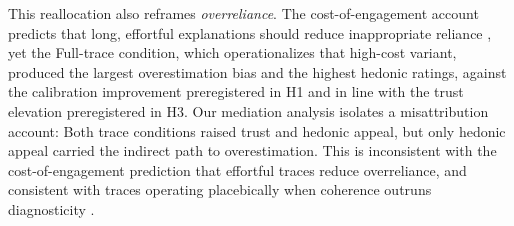 \documentclass[manuscript,review,anonymous]{acmart}
\let\xtodo\todo
\renewcommand{\todo}[1]{\xtodo[inline,color=green!50]{#1}}
\newcommand{\todoshort}[1]{\xtodo[inline,color=cyan!30]{\textbf{SHORTER:} #1}}
\begin{document}
This reallocation also reframes \textit{overreliance}. The cost-of-engagement account predicts that long, effortful explanations should reduce inappropriate reliance \cite{vasconcelos2023explanations}, yet the Full-trace condition, which operationalizes that high-cost variant, produced the largest overestimation bias and the highest hedonic ratings, against the calibration improvement preregistered in H1 and in line with the trust elevation preregistered in H3. Our mediation analysis isolates a misattribution account: Both trace conditions raised trust and hedonic appeal, but only hedonic appeal carried the indirect path to overestimation. This is inconsistent with the cost-of-engagement prediction \cite{vasconcelos2023explanations} that effortful traces reduce overreliance, and consistent with traces operating placebically when coherence outruns diagnosticity \cite{eiband2019impact}. %
\end{document}
